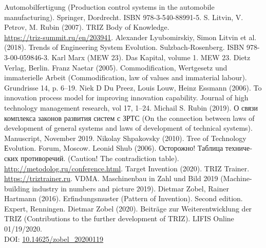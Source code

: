 \documentclass{llncs}
\begin{document}
\begin{thebibliography}{xxx}
  Automobilfertigung (Production control systems in the automobile
  manufacturing). Springer, Dordrecht. ISBN 978-3-540-88991-5.
 S. Litvin, V. Petrov, M. Rubin (2007). TRIZ Body of
  Knowledge. \\ \url{https://triz-summit.ru/en/203941}.
 Alexander Lyubomirskiy, Simon Litvin et al. (2018). Trends
  of Engineering System Evolution. Sulzbach-Rosenberg. ISBN 978-3-00-059846-3.
 Karl Marx (MEW 23). Das Kapital, volume 1. MEW 23. Dietz
  Verlag, Berlin.
 Franz Naetar (2005). Commodification, Wertgesetz und
  immaterielle Arbeit (Commodification, law of values and immaterial labour).
  Grundrisse 14, p. 6--19.
 Niek D Du Preez, Louis Louw, Heinz Essmann (2006). To
  innovation process model for improving innovation capability. Journal of
  high technology management research, vol 17, 1--24.
 Michail S. Rubin (2019).  \foreignlanguage{russian}{О
  связи комплекса законов развития систем с ЗРТС} (On the connection between
  laws of development of general systems and laws of development of technical
  systems). Manuscript, November 2019.
 Nikolay Shpakovsky (2010). Tree of Technology
  Еvolution. Forum, Moscow.
 Leonid Shub (2006). \foreignlanguage{russian}{Осторожно!
  Таблица технических противоречий}. (Caution! The contradiction table).
  \url{http://metodolog.ru/conference.html}. 
 Target Invention (2020). TRIZ Trainer.
  \url{https://triztrainer.ru}.
 VDMA. Maschinenbau in Zahl und Bild 2019 (Machine-building
  industry in numbers and picture 2019).
 Dietmar Zobel, Rainer Hartmann (2016). Erfindungsmuster
  (Pattern of Invention).  Second edition. Expert, Renningen.
 Dietmar Zobel (2020). Beiträge zur Weiterentwicklung der
  TRIZ (Contributions to the further development of TRIZ).  LIFIS Online
  01/19/2020.\\ DOI: \url{10.14625/zobel_20200119}
\end{thebibliography}
\end{document}
